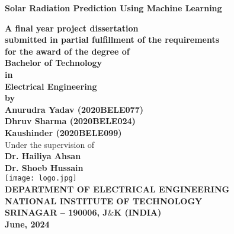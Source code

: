 \documentclass[12pt,a4paper]{report}
\begin{document}
	\begin{center}
		\begin{huge}
			\bf{Solar Radiation Prediction Using Machine Learning\\}
		\end{huge}
		\vspace*{35pt}		
		\textbf{A final year project dissertation\\
			{submitted in partial fulfillment of the requirements \\for the award of the degree of}\\}
		\vspace{20pt}
		\textbf{Bachelor of Technology}\\
		\textbf{in}\\
		\textbf{Electrical Engineering}\\
		\vspace{10pt}
		\textbf{by\\
			\vspace{10pt}
			 Anurudra Yadav (2020BELE077)\\Dhruv Sharma (2020BELE024)\\ Kaushinder (2020BELE099)\\}
		\vspace{10pt}
		Under the supervision of\\
		\textbf{Dr. Hailiya Ahsan}\\
            \textbf{Dr. Shoeb Hussain}\\
				\vspace{10pt}
		\texttt{[image: logo.jpg]} \\
		\vspace{10pt}
		\textbf{DEPARTMENT OF ELECTRICAL  ENGINEERING\\
			NATIONAL INSTITUTE OF TECHNOLOGY\\
			SRINAGAR – 190006, J$\&$K (INDIA)\\
			June, 2024	\\[0.5in]
   \vspace*{\fill}%
\noindent
{}
\vfill
   }
   \end{center}
\clearpage
\newcommand{\RN}[1]{%
	\textup{\uppercase\expandafter{\romannumeral#1}}%
}
\end{document}
